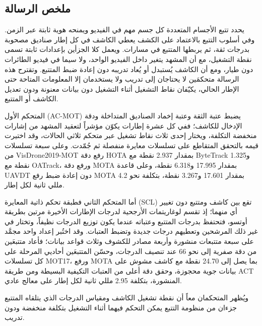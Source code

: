 \documentclass[12pt,a4paper]{article}
\begin{document}
\begin{otherlanguage}{arabic}
\section*{\LARGE ملخص الرسالة}
\thispagestyle{empty}

يحدد تتبع الأجسام المتعددة كل جسم مهم في الفيديو ويمنحه هوية ثابتة عبر الزمن. وفي أسلوب التتبع بالاعتماد على الكشف يعطي الكاشف في كل إطار صناديق مصحوبة بدرجات ثقة، ثم يربطها المتتبع في مسارات. ويعمل كلا الجزأين بإعدادات ثابتة تسمى نقطة التشغيل، مع أن المشهد يتغير داخل الفيديو الواحد، ولا سيما في فيديو الطائرات دون طيار، ومع أن الكاشف يُستبدل أو يُعاد تدريبه دون إعادة ضبط المتتبع. وتقترح هذه الرسالة متحكمَين لا يحتاجان إلى تدريب ولا يستخدمان إلا المعلومات المتاحة حتى الإطار الحالي، يكيّفان نقاط التشغيل أثناء التشغيل دون بيانات معنونة ودون تعديل الكاشف أو المتتبع.

المتحكم الأول (\foreignlanguage{english}{AC-MOT}) يضبط عتبة الثقة وعتبة إخماد الصناديق المتداخلة ودقة الإدخال للكاشف؛ ففي كل عشرة إطارات يكوّن مؤشراً لتعقيد المشهد من إشارات منخفضة التكلفة، ويختار إحدى ثلاث نقاط تشغيل عبر متحكم ثلاثي الحالات، وقد اختيرت قيمه بالتحقق المتقاطع على تسلسلات معايرة منفصلة ثم جُمّدت. وعلى سبعة تسلسلات من \foreignlanguage{english}{VisDrone2019-MOT} رفع دقة \foreignlanguage{english}{HOTA} بمقدار \foreignlanguage{english}{2.937} نقطة مع \foreignlanguage{english}{ByteTrack} و\foreignlanguage{english}{1.325} نقطة مع \foreignlanguage{english}{OATrack}، ورفع دقة \foreignlanguage{english}{MOTA} بمقدار \foreignlanguage{english}{17.995} و\foreignlanguage{english}{6.318} نقطة، وعلى قاعدة \foreignlanguage{english}{UAVDT} دون إعادة ضبط رفع \foreignlanguage{english}{MOTA} بمقدار \foreignlanguage{english}{17.601} و\foreignlanguage{english}{3.267} نقطة، بتكلفة نحو \foreignlanguage{english}{4.2} مللي ثانية لكل إطار.

أما المتحكم الثاني فطبقة تحكم ذاتية المعايرة (\foreignlanguage{english}{SCL}) تقع بين كاشف ومتتبع دون تغيير أي منهما؛ إذ تقسم لوغاريتمات الأرجحية لدرجات الإطارات الأخيرة مرتين بطريقة أوتسو، فتحتفظ بدرجات المتتبع وعتباته عندما يكون توزيع الدرجات نظيفاً، وتختار في غير ذلك المرشحين وتعطيهم درجات جديدة وتضبط العتبات. وقد اختُبر إعداد واحد مجمَّد على سبعة متتبعات منشورة وأربعة مصادر للكشوف وثلاث قواعد بيانات؛ فأعاد متتبعَين من دقة صفرية إلى نحو \foreignlanguage{english}{66} عند تنصيف الدرجات، وحسّن المتتبعَين أحاديي المرحلة على كل تسلسلات \foreignlanguage{english}{MOT17}، ورفع \foreignlanguage{english}{MOTA} بما يصل إلى \foreignlanguage{english}{24.70} نقطة مع كاشف مشوش على بيانات جوية محجوزة، وحقق دقة أعلى من العتبات التكيفية البسيطة ومن طريقة \foreignlanguage{english}{ACT} المنشورة، بتكلفة \foreignlanguage{english}{2.95} مللي ثانية لكل إطار على معالج عادي.

ويُظهر المتحكمان معاً أن نقطة تشغيل الكاشف ومقياس الدرجات الذي يتلقاه المتتبع جزءان من منظومة التتبع يمكن التحكم فيهما أثناء التشغيل بتكلفة منخفضة ودون تدريب.


\clearpage
\end{otherlanguage}
\end{document}
